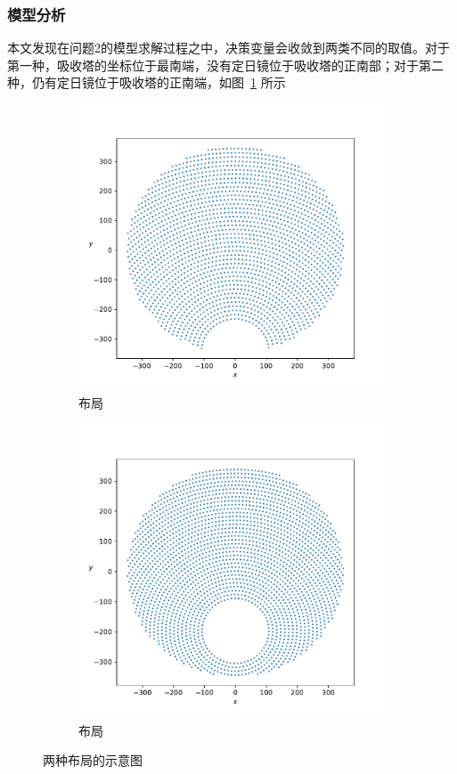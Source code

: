 \subsubsection{模型分析}
本文发现在问题2的模型求解过程之中，决策变量会收敛到两类不同的取值。对于第一种，吸收塔的坐标位于最南端，没有定日镜位于吸收塔的正南部；对于第二种，仍有定日镜位于吸收塔的正南端，如图~\ref{fig:two_arange} 所示
\begin{figure}[H]
\centering
\begin{subfigure}[b]{0.4\textwidth}
\centering
\includegraphics[scale = 0.3]{north_field.pdf}
\caption{ 布局}
\end{subfigure}
\begin{subfigure}[b]{0.4\textwidth}
\centering
\includegraphics[scale = 0.3]{circular.pdf}
\caption{ 布局}
\end{subfigure}
\caption{两种布局的示意图}
\label{fig:two_arange}
\end{figure}
